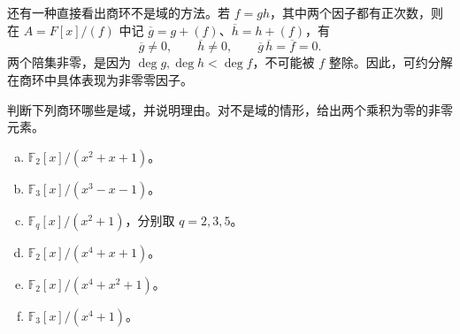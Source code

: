 \documentclass[lang=cn,a4paper,fontset=none,zihao=false,10pt,openany,twoside]{beautybook}
\numberwithin{algorithm}{chapter}
\begin{document}
还有一种直接看出商环不是域的方法。若 $f=gh$，其中两个因子都有正次数，则在 $A=F[x]/(f)$ 中记 $\overline g=g+(f)$、$\overline h=h+(f)$，有
\[
 \overline g\ne0,\qquad \overline h\ne0,\qquad
 \overline g\,\overline h=\overline f=0.
\]
两个陪集非零，是因为 $\deg g,\deg h<\deg f$，不可能被 $f$ 整除。因此，可约分解在商环中具体表现为非零零因子。

\begin{example}[判断多项式商环是否为域]\label{ex:finite-polynomial-quotients}
判断下列商环哪些是域，并说明理由。对不是域的情形，给出两个乘积为零的非零元素。
\begin{enumerate}[(a)]
\item $\mathbb F_2[x]/(x^2+x+1)$。
\item $\mathbb F_3[x]/(x^3-x-1)$。
\item $\mathbb F_q[x]/(x^2+1)$，分别取 $q=2,3,5$。
\item $\mathbb F_2[x]/(x^4+x+1)$。
\item $\mathbb F_2[x]/(x^4+x^2+1)$。
\item $\mathbb F_3[x]/(x^4+1)$。
\end{enumerate}
\end{example}
\end{document}
